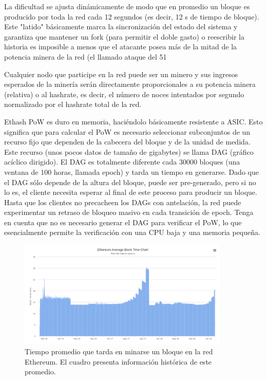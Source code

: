 La dificultad se ajusta dinámicamente de modo que en promedio un bloque es producido por toda la red cada 12 segundos (es decir, 12 s de tiempo de bloque). Este "latido" básicamente marca la sincronización del estado del sistema y garantiza que mantener un fork (para permitir el doble gasto) o reescribir la historia es imposible a menos que el atacante posea más de la mitad de la potencia minera de la red (el llamado ataque del 51%

Cualquier nodo que participe en la red puede ser un minero y sus ingresos esperados de la minería serán directamente proporcionales a su potencia minera (relativa) o al hashrate, es decir, el número de noces intentados por segundo normalizado por el hashrate total de la red.

Ethash PoW es duro en memoria, haciéndolo básicamente resistente a ASIC. Esto significa que para calcular el PoW es necesario seleccionar subconjuntos de un recurso fijo que dependen de la cabecera del bloque y de la unidad de medida. Este recurso (unos pocos datos de tamaño de gigabytes) se llama DAG (gráfico acíclico dirigido). El DAG es totalmente diferente cada 30000 bloques (una ventana de 100 horas, llamada epoch) y tarda un tiempo en generarse. Dado que el DAG sólo depende de la altura del bloque, puede ser pre-generado, pero si no lo es, el cliente necesita esperar al final de este proceso para producir un bloque. Hasta que los clientes no precacheen los DAGs con antelación, la red puede experimentar un retraso de bloqueo masivo en cada transición de epoch. Tenga en cuenta que no es necesario generar el DAG para verificar el PoW, lo que esencialmente permite la verificación con una CPU baja y una memoria pequeña.

\begin{figure}[H] 
\centering    
\includegraphics[width=0.9\textwidth]{mining-time}
\caption[mining-time]{Tiempo promedio que tarda en minarse un bloque en la red Ethereum. El cuadro presenta información histórica de este promedio.}
\label{fig:mining-time}
\end{figure}

